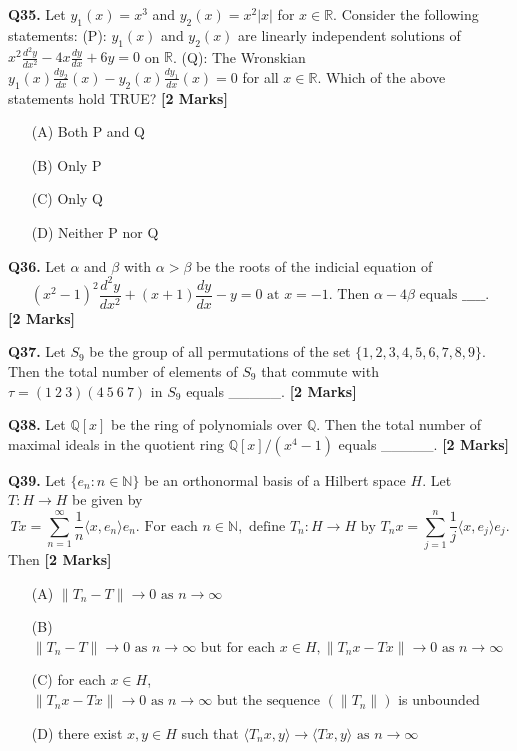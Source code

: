 \documentclass[11pt]{article}
\newcommand{\questionb}[2]{
    \noindent\textbf{Q#2.} #1 \hfill \textbf{[2 Marks]}
}
\begin{document}
\questionb{Let \( y_1(x) = x^3 \) and \( y_2(x) = x^2 |x| \) for \( x \in \mathbb{R} \). Consider the following statements:
(P): \( y_1(x) \) and \( y_2(x) \) are linearly independent solutions of \( x^2 \frac{d^2 y}{dx^2} - 4x \frac{dy}{dx} + 6y = 0 \) on \( \mathbb{R} \).
(Q): The Wronskian \( y_1(x) \frac{dy_2}{dx}(x) - y_2(x) \frac{dy_1}{dx}(x) = 0 \) for all \( x \in \mathbb{R} \).
Which of the above statements hold TRUE?}{35}
\begin{enumerate}
    \item[(A)] Both P and Q  
    \item[(B)] Only P  
    \item[(C)] Only Q  
    \item[(D)] Neither P nor Q  
\end{enumerate}
\vspace{0.5cm}

\questionb{Let \(\alpha\) and \(\beta\) with \(\alpha > \beta\) be the roots of the indicial equation of  
\[(x^2 - 1)^2 \frac{d^2 y}{dx^2} + (x + 1) \frac{dy}{dx} - y = 0 \text{ at } x = -1. \text{ Then } \alpha - 4\beta \text{ equals \_\_\_\_\_.} \]}{36}
\vspace{0.5cm}

\questionb{Let \(S_9\) be the group of all permutations of the set \(\{1, 2, 3, 4, 5, 6, 7, 8, 9\}\). Then the total number of elements of \(S_9\) that commute with \(\tau = (1 \ 2 \ 3)(4 \ 5 \ 6 \ 7)\) in \(S_9\) equals \_\_\_\_\_.}{37}
\vspace{0.5cm}

\questionb{Let \(\mathbb{Q}[x]\) be the ring of polynomials over \(\mathbb{Q}\). Then the total number of maximal ideals in the quotient ring \(\mathbb{Q}[x] / (x^4 - 1)\) equals \_\_\_\_\_.}{38}
\vspace{0.5cm}

\questionb{Let \(\{e_n : n \in \mathbb{N}\}\) be an orthonormal basis of a Hilbert space \(H\). Let \(T: H \to H\) be given by  
\[Tx = \sum_{n=1}^{\infty} \frac{1}{n} \langle x, e_n \rangle e_n. \text{ For each } n \in \mathbb{N}, \text{ define } T_n : H \to H \text{ by } T_n x = \sum_{j=1}^{n} \frac{1}{j} \langle x, e_j \rangle e_j.\]
Then}{39}
\begin{enumerate}
    \item[(A)] \(\|T_n - T\| \to 0 \text{ as } n \to \infty\)  
    \item[(B)] \(\|T_n - T\| \to 0 \text{ as } n \to \infty \text{ but for each } x \in H, \|T_n x - Tx\| \to 0 \text{ as } n \to \infty\)  
    \item[(C)] for each \(x \in H\), \(\|T_n x - Tx\| \to 0 \text{ as } n \to \infty \text{ but the sequence } (\|T_n\|)\) is unbounded  
    \item[(D)] there exist \(x, y \in H\) such that \(\langle T_n x, y \rangle \to \langle Tx, y \rangle \text{ as } n \to \infty\)  
\end{enumerate}
\vspace{0.5cm}
\end{document}
